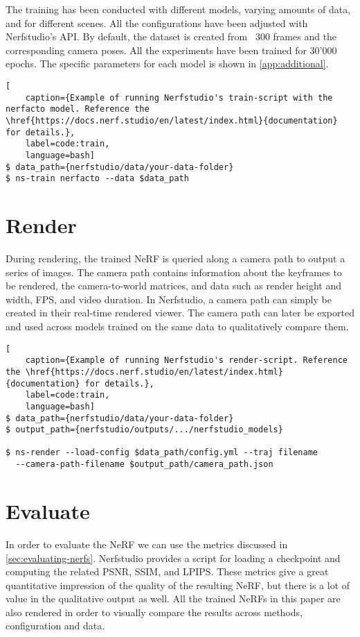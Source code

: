 The training has been conducted with different models, varying amounts of data, and for different scenes. All the configurations have been adjusted with Nerfstudio's API. By default, the dataset is created from ~300 frames and the corresponding camera poses. All the experiments have been trained for 30'000 epochs. The specific parameters for each model is shown in \autoref{app:additional}.

\begin{lstlisting}[
    caption={Example of running Nerfstudio's train-script with the nerfacto model. Reference the \href{https://docs.nerf.studio/en/latest/index.html}{documentation} for details.},
    label=code:train,
    language=bash]
$ data_path={nerfstudio/data/your-data-folder}
$ ns-train nerfacto --data $data_path
\end{lstlisting}

\section{Render}
During rendering, the trained NeRF is queried along a camera path to output a series of images. The camera path contains information about the keyframes to be rendered, the camera-to-world matrices, and data such as render height and width, FPS, and video duration. In Nerfstudio, a camera path can simply be created in their real-time rendered viewer. The camera path can later be exported and used across models trained on the same data to qualitatively compare them.


\begin{lstlisting}[
    caption={Example of running Nerfstudio's render-script. Reference the \href{https://docs.nerf.studio/en/latest/index.html}{documentation} for details.},
    label=code:train,
    language=bash]
$ data_path={nerfstudio/data/your-data-folder}
$ output_path={nerfstudio/outputs/.../nerfstudio_models}

$ ns-render --load-config $data_path/config.yml --traj filename 
  --camera-path-filename $output_path/camera_path.json
\end{lstlisting}




\section{Evaluate}
In order to evaluate the NeRF we can use the metrics discussed in \autoref{sec:evaluating-nerfs}. Nerfstudio provides a script for loading a checkpoint and computing the related PSNR, SSIM, and LPIPS. These metrics give a great quantitative impression of the quality of the resulting NeRF, but there is a lot of value in the qualitative output as well. All the trained NeRFs in this paper are also rendered in order to visually compare the results across methods, configuration and data.

